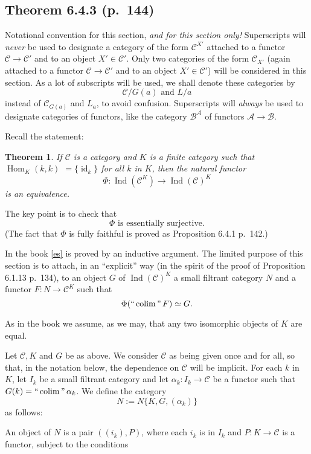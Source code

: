 \documentclass[12pt]{article}
\newtheorem{thm}{Theorem}
\theoremstyle{remark}
\theoremstyle{definition}
\newcommand{\A}{\mathcal A}
\newcommand{\B}{\mathcal B}
\newcommand{\C}{\mathcal C}
\DeclareMathOperator*{\coli}{colim}
\DeclareMathOperator*{\ic}{``\coli"}
\DeclareMathOperator{\id}{id}
\DeclareMathOperator{\Hom}{Hom}%
\DeclareMathOperator{\Ind}{Ind}
\begin{document}
\subsection{Theorem 6.4.3 (p.~144)}
%
Notational convention for this section, {\em and for this section only!} Superscripts will {\em never} be used to designate a category of the form $\C^{X'}$ attached to a functor $\C\to\C'$ and to an object $X'\in\C'$. Only two categories of the form $\C_{X'}$ (again attached to a functor $\C\to\C'$ and to an object $X'\in\C'$) will be considered in this section. As a lot of subscripts will be used, we shall denote these categories by 
%
\begin{equation}\label{slice}
\C/G(a)\text{ and }L/a
\end{equation}
%
instead of $\C_{G(a)}$ and $L_a$, to avoid confusion. Superscripts will {\em always} be used to designate categories of functors, like the category $\B^\A$ of functors $\A\to\B$. 

Recall the statement: 
%
\begin{thm}
If $\C$ is a category and $K$ is a finite category such that $\Hom_K(k,k)$ $=\{\id_k\}$ for all $k$ in $K$, then the natural functor 
$$
\Phi:\Ind(\C^K)\to\Ind(\C)^K
$$ 
is an equivalence.
\end{thm}
%

The key point is to check that 
%
\begin{equation}\label{es} 
\Phi\text{ is essentially surjective.} 
\end{equation} 
%
(The fact that $\Phi$ is fully faithful is proved as Proposition 6.4.1 p.~142.) 

In the book \eqref{es} is proved by an inductive argument. The limited purpose of this section is to attach, in an ``explicit'' way (in the spirit of the proof of Proposition 6.1.13 p.~134), to an object $G$ of $\Ind(\C)^K$ a small filtrant category $N$ and a functor $F:N\to\C^K$ such that 
$$ 
\Phi(\ic F)\simeq G. 
$$ 

As in the book we assume, as we may, that any two isomorphic objects of $K$ are equal. 

Let $\C,K$ and $G$ be as above. We consider $\C$ as being given once and for all, so that, in the notation below, the dependence on $\C$ will be implicit. For each $k$ in $K$, let $I_k$ be a small filtrant category and let $\alpha_k:I_k\to\C$ be a functor such that $G(k)=\ic\alpha_k$. We define the category 
$$
N:=N\{K,G,(\alpha_k)\}
$$ 
as follows:

An object of $N$ is a pair $((i_k),P)$, where each $i_k$ is in $I_k$ and $P:K\to\C$ is a functor, subject to the conditions 
\end{document}
